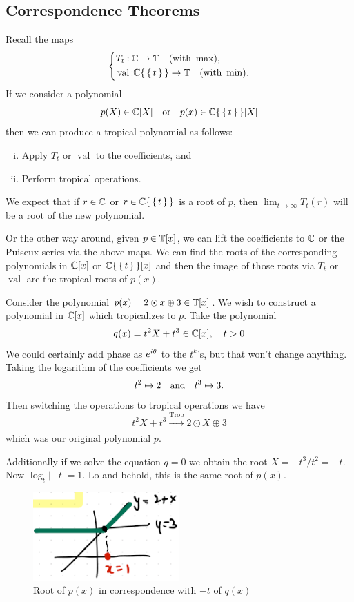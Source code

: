 \documentclass[12pt]{memoir}
\DeclareMathOperator{\val}{val}
\DeclareMathOperator{\Trop}{Trop}
\begin{document}
\subsection{Correspondence Theorems}
Recall the maps
$$
\left\lbrace 
\begin{aligned}
    &T_t\: \bC\to\bT\quad(\text{with }\max),\\
    &\val\: \bC\set{\set{t}}\to\bT\quad(\text{with }\min).
\end{aligned}
\right.
$$
If we consider a polynomial 
$$p(X)\in\mathbb{C}[X]\quad\text{or}\quad p(x)\in\mathbb{C}\{\,\{\,t\,\}\,\}[X]$$
then we can produce a tropical polynomial as follows:

\begin{enumerate}[i.]
    \item Apply $T_t$ or $\val$ to the coefficients, and
    \item Perform tropical operations.
\end{enumerate}

We expect that if $r\in\mathbb{C}$ or $r\in\mathbb{C}\{\,\{\,t\,\}\,\}$ is a root of $p$, then $\lim_{t\to\infty}T_t(r)$ will be a root of the new polynomial.\par
Or the other way around, given $p\in\mathbb{T}[x]$, we can lift the coefficients to $\mathbb{C}$ or the Puiseux series via the above maps. We can find the roots of the corresponding polynomials in $\mathbb{C}[x]$ or $\mathbb{C}\{\,\{\,t\,\}\,\}[x]$ and then the image of those roots via $T_t$ or $\val$ are the tropical roots of $p(x)$.

\begin{Ex}
    Consider the polynomial $p(x)=2\odot x\oplus3\in\mathbb{T}[x]$. We wish to construct a polynomial in $\mathbb{C}[x]$ which tropicalizes to $p$. Take the polynomial 
    $$q(x)=t^2X+t^3\in\mathbb{C}[x],\quad t>0$$ 
    We could certainly add phase as $e^{i\theta}$ to the $t^k$'s, but that won't change anything. Taking the logarithm of the coefficients we get 
    $$t^2\mapsto 2\quad\text{and}\quad t^3\mapsto 3.$$ 
    Then switching the operations to tropical operations we have
    $$t^2X+t^3\xrightarrow[]{\Trop}2\odot X\oplus 3$$ 
    which was our original polynomial $p$.\par 
    Additionally if we solve the equation $q=0$ we obtain the root $X=-t^3/t^2=-t$. Now $\log_t|-t|=1$. Lo and behold, this is the same root of $p(x)$. 
    \begin{figure}[h!]
        \centering
        \includegraphics[width=0.5\textwidth]{figs/fig4-4CorrespondenceRoots1Example.png}
        \caption{Root of $p(x)$ in correspondence with $-t$ of $q(x)$}
        \label{fig:4.4-CorrespondenceRoots1Example}
    \end{figure}
\end{Ex}
\end{document}
